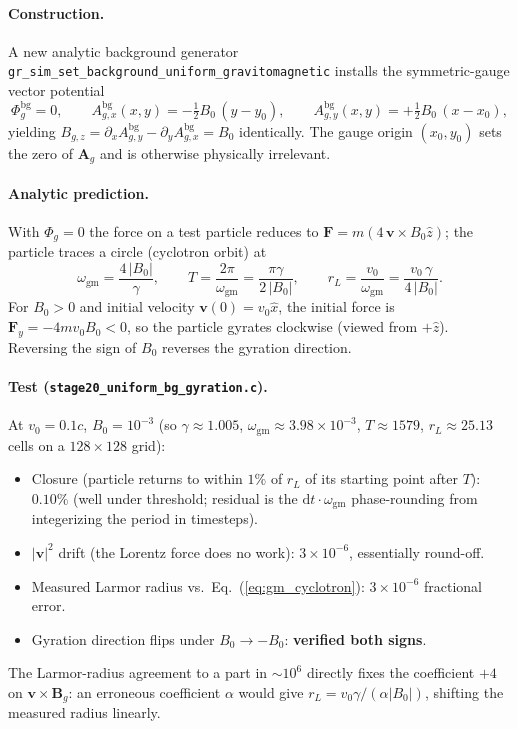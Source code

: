 \documentclass[11pt,a4paper]{article}
\newcommand{\vv}[1]{\mathbf{#1}}
\newcommand{\Phig}{\Phi_g}
\newcommand{\Ag}{\vv{A}_g}
\newcommand{\dd}{\mathrm{d}}
\begin{document}
\paragraph{Construction.}  A new analytic background generator
\texttt{gr\_sim\_set\_background\_uniform\_gravitomagnetic} installs the
symmetric-gauge vector potential
\begin{equation}
\label{eq:uniform_bg_symmetric_gauge}
  \Phig^{\mathrm{bg}} = 0,\qquad
  A_{g,x}^{\mathrm{bg}}(x,y) = -\tfrac{1}{2}B_0\,(y - y_0),\qquad
  A_{g,y}^{\mathrm{bg}}(x,y) = +\tfrac{1}{2}B_0\,(x - x_0),
\end{equation}
yielding $B_{g,z} = \partial_x A_{g,y}^{\mathrm{bg}} - \partial_y
A_{g,x}^{\mathrm{bg}} = B_0$ identically.  The gauge origin $(x_0, y_0)$
sets the zero of $\Ag$ and is otherwise physically irrelevant.

\paragraph{Analytic prediction.}  With $\Phig = 0$ the force on a test
particle reduces to $\vv{F} = m(4\,\vv{v}\!\times\!B_0\hat z)$; the
particle traces a circle (cyclotron orbit) at
\begin{equation}
\label{eq:gm_cyclotron}
  \omega_{\mathrm{gm}} = \frac{4\,|B_0|}{\gamma},\qquad
  T = \frac{2\pi}{\omega_{\mathrm{gm}}} = \frac{\pi\gamma}{2\,|B_0|},\qquad
  r_L = \frac{v_0}{\omega_{\mathrm{gm}}} = \frac{v_0\,\gamma}{4\,|B_0|}.
\end{equation}
For $B_0 > 0$ and initial velocity $\vv{v}(0) = v_0\hat x$, the initial
force is $\vv{F}_y = -4m v_0 B_0 < 0$, so the particle gyrates
clockwise (viewed from $+\hat z$).  Reversing the sign of $B_0$ reverses
the gyration direction.

\paragraph{Test (\texttt{stage20\_uniform\_bg\_gyration.c}).}  At
$v_0 = 0.1c$, $B_0 = 10^{-3}$ (so $\gamma \approx 1.005$,
$\omega_{\mathrm{gm}} \approx 3.98\times 10^{-3}$,
$T \approx 1579$, $r_L \approx 25.13$ cells on a $128\times 128$ grid):
\begin{itemize}
  \item Closure (particle returns to within $1\%$ of $r_L$ of its
    starting point after $T$): \textbf{$0.10\%$} (well under threshold;
    residual is the $\dd t \cdot \omega_{\mathrm{gm}}$ phase-rounding from
    integerizing the period in timesteps).
  \item $|\vv{v}|^2$ drift (the Lorentz force does no work):
    \textbf{$3\times 10^{-6}$}, essentially round-off.
  \item Measured Larmor radius vs.\
    Eq.~(\ref{eq:gm_cyclotron}): \textbf{$3\times 10^{-6}$}
    fractional error.
  \item Gyration direction flips under $B_0 \to -B_0$: \textbf{verified
    both signs}.
\end{itemize}
The Larmor-radius agreement to a part in $\sim 10^6$ directly fixes the
coefficient $+4$ on $\vv{v}\!\times\!\vv{B}_g$: an erroneous coefficient
$\alpha$ would give $r_L = v_0\gamma/(\alpha|B_0|)$, shifting the
measured radius linearly.
\end{document}

